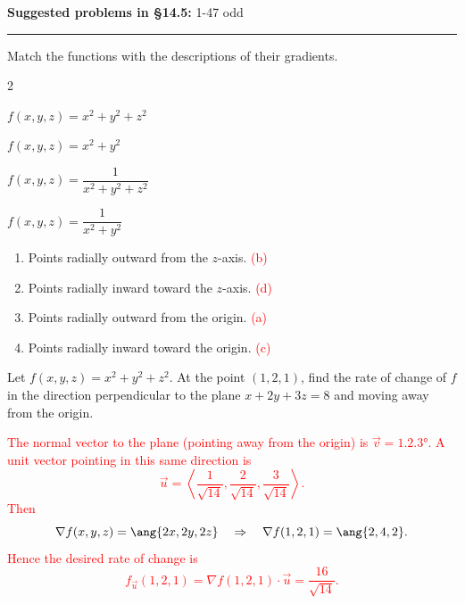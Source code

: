 \documentclass[12pt,reqno]{amsart}
\begin{document}
\textbf{Suggested problems in \S14.5:} 1-47 odd 

\medskip
\hrule

\bigskip

\prob Match the functions with the descriptions of their gradients.

\medskip
\begin{henumerate}{2}
\item $f(x,y,z) = x^2+y^2+z^2$
\item $f(x,y,z) = x^2+y^2$
\item $f(x,y,z) = \dfrac{1}{x^2+y^2+z^2}$
\item $f(x,y,z) = \dfrac{1}{x^2+y^2}$
\end{henumerate}

\bigskip
\begin{enumerate}
\item[(i)] Points radially outward from the $z$-axis. \textcolor{red}{(b)} \medskip
\item[(ii)] Points radially inward toward the $z$-axis. \textcolor{red}{(d)} \medskip
\item[(iii)] Points radially outward from the origin. \textcolor{red}{(a)} \medskip
\item[(iv)] Points radially inward toward the origin. \textcolor{red}{(c)}
\end{enumerate}

\bigskip
\prob Let $f(x,y,z) = x^2+y^2+z^2$. At the point $(1,2,1)$, find the rate of change of $f$ in the direction perpendicular to the plane $x+2y+3z=8$ and moving away from the origin.

\bigskip
\textcolor{red}{The normal vector to the plane (pointing away from the origin) is $\vec{v}= \ang{ 1,2,3}$. A unit vector pointing in this same direction is
	\[\vec{u} = \left\langle \frac{1}{\sqrt{14}}, \frac{2}{\sqrt{14}}, \frac{3}{\sqrt{14}}\right\rangle.
	\]
Then
	\[\nabla f(x,y,z) = \ang{ 2x,2y,2z} \quad \Rightarrow \quad \nabla f(1,2,1) = \ang{ 2,4,2}.
	\]
Hence the desired rate of change is
	\[f_{\vec{u}}(1,2,1) = \nabla f(1,2,1) \cdot \vec{u} = \frac{16}{\sqrt{14}}.
	\]}
\end{document}
